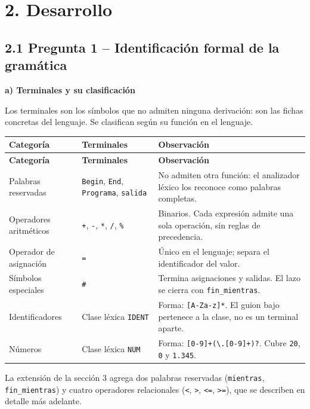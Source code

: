 \documentclass[11pt,letterpaper]{article}
\newcommand{\apartado}[1]{\par\Needspace{4\baselineskip}\medskip\noindent\textbf{#1}\par\nobreak\smallskip}
\begin{document}
\clearpage
\section*{2. Desarrollo}

\subsection*{2.1 Pregunta 1 -- Identificación formal de la gramática}

\apartado{a) Terminales y su clasificación}

Los terminales son los símbolos que no admiten ninguna derivación: son las fichas concretas del
lenguaje. Se clasifican según su función en el lenguaje.

\begin{longtable}{|L{3.3cm}|L{5.1cm}|L{\dimexpr\textwidth-3.3cm-5.1cm-6\arrayrulewidth\relax}|}
\hline
{}\textbf{Categoría} & \textbf{Terminales} & \textbf{Observación}\\\hline
\endfirsthead
\hline
{}\textbf{Categoría} & \textbf{Terminales} & \textbf{Observación}\\\hline
\endhead

Palabras reservadas & \texttt{Begin}, \texttt{End}, \texttt{Programa}, \texttt{salida} &
No admiten otra función: el analizador léxico los reconoce como palabras completas.\\\hline
Operadores aritméticos & \texttt{+}, \texttt{-}, \texttt{*}, \texttt{/}, \texttt{\%} &
Binarios. Cada expresión admite una sola operación, sin reglas de precedencia.\\\hline
Operador de asignación & \texttt{=} &
Único en el lenguaje; separa el identificador del valor.\\\hline
Símbolos especiales & \texttt{\#} &
Termina asignaciones y salidas. El lazo se cierra con \texttt{fin\_mientras}.\\\hline
Identificadores & Clase léxica \texttt{IDENT} &
Forma: \texttt{[A-Za-z]\allowbreak[A-Za-z0-9\_]*}. El guion bajo pertenece a la clase, no es un terminal aparte.\\\hline
Números & Clase léxica \texttt{NUM} &
Forma: \texttt{[0-9]+(\allowbreak\textbackslash.[0-9]+)?}. Cubre \texttt{20}, \texttt{0} y \texttt{1.345}.\\\hline
\end{longtable}

La extensión de la sección 3 agrega dos palabras reservadas (\texttt{mientras},
\texttt{fin\_mientras}) y cuatro operadores relacionales (\texttt{<}, \texttt{>}, \texttt{\textless=},
\texttt{\textgreater=}), que se describen en detalle más adelante.
\end{document}
